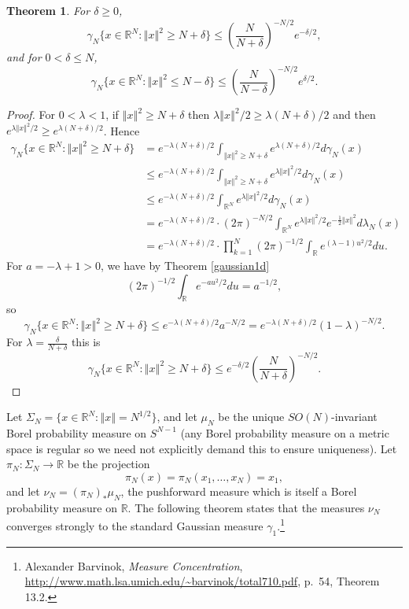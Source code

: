 \documentclass{article}
\newcommand{\norm}[1]{\left\Vert #1 \right\Vert}
\newtheorem{theorem}{Theorem}
\theoremstyle{definition}
\begin{document}
\begin{theorem}
For $\delta \geq 0$,
\[
\gamma_N\{x \in \mathbb{R}^N: \norm{x}^2 \geq N+\delta \} \leq \left( \frac{N}{N+\delta} \right)^{-N/2} e^{-\delta/2},
\]
and for $0<\delta \leq N$,
\[
\gamma_N\{x \in \mathbb{R}^N: \norm{x}^2 \leq N-\delta\} \leq \left(\frac{N}{N-\delta} \right)^{-N/2} e^{\delta/2}.
\]
\end{theorem}
\begin{proof}
For $0<\lambda<1$, if $\norm{x}^2 \geq N+\delta$ then $\lambda \norm{x}^2/2 \geq \lambda(N+\delta)/2$
and then $e^{\lambda \norm{x}^2/2} \geq e^{\lambda(N+\delta)/2}$.
Hence
\begin{align*}
\gamma_N\{x \in \mathbb{R}^N: \norm{x}^2 \geq N+\delta\}&=e^{-\lambda(N+\delta)/2} \int_{\norm{x}^2 \geq N+\delta} e^{\lambda(N+\delta)/2} d\gamma_N(x)\\
&\leq e^{-\lambda(N+\delta)/2} \int_{\norm{x}^2 \geq N+\delta} e^{\lambda \norm{x}^2/2} d\gamma_N(x)\\
&\leq e^{-\lambda(N+\delta)/2} \int_{\mathbb{R}^N} e^{\lambda \norm{x}^2/2} d\gamma_N(x)\\
&=  e^{-\lambda(N+\delta)/2} 
\cdot  (2\pi)^{-N/2}
\int_{\mathbb{R}^N} e^{\lambda \norm{x}^2/2}    e^{-\frac{1}{2}\norm{x}^2} d\lambda_N(x)\\
&=  e^{-\lambda(N+\delta)/2}  \cdot \prod_{k=1}^N (2\pi)^{-1/2} \int_{\mathbb{R}} e^{(\lambda-1) u^2/2} du.
\end{align*}
For $a=-\lambda+1>0$, we have by Theorem \ref{gaussian1d}
\[
(2\pi)^{-1/2} \int_{\mathbb{R}}  e^{-au^2/2} du = a^{-1/2},
\]
so
\[
\gamma_N\{x \in \mathbb{R}^N: \norm{x}^2 \geq N+\delta\} \leq
e^{-\lambda(N+\delta)/2}  a^{-N/2} = e^{-\lambda(N+\delta)/2}   (1-\lambda)^{-N/2}.
\]
For $\lambda=\frac{\delta}{N+\delta}$ this is
\[
\gamma_N\{x \in \mathbb{R}^N: \norm{x}^2 \geq N+\delta\} \leq e^{-\delta/2} \left( \frac{N}{N+\delta} \right)^{-N/2}.
\]
\end{proof}


Let $\Sigma_N=\{x \in \mathbb{R}^N: \norm{x} = N^{1/2}\}$, and let $\mu_N$ be the unique
$SO(N)$-invariant  Borel probability measure on $S^{N-1}$ (any Borel probability measure on a metric space is regular so we need not explicitly demand this to ensure uniqueness).
Let $\pi_N:\Sigma_N \to \mathbb{R}$ be the projection 
\[
\pi_N(x) = \pi_N(x_1,\ldots,x_N) = x_1,
\]
and let $\nu_N=(\pi_N)_* \mu_N$, the pushforward measure which is itself a Borel probability measure on $\mathbb{R}$. 
The following theorem states that the measures $\nu_N$ converges strongly to the standard Gaussian measure $\gamma_1$.\footnote{Alexander
Barvinok, {\em Measure Concentration}, \url{http://www.math.lsa.umich.edu/~barvinok/total710.pdf},
p.~54, Theorem 13.2.}
\end{document}
